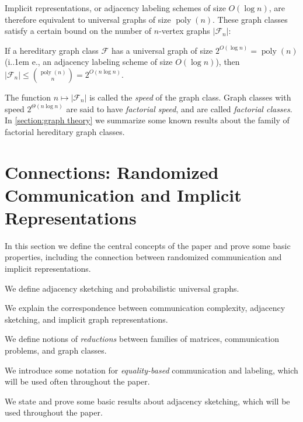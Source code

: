 \documentclass{article}
\makeatletter
\DeclareMathOperator{\poly}{poly}
\newcommand{\cF}{\ensuremath{\mathcal{F}}}
\newcommand*\ie{i.\kern.1em e.\@\xspace} %
\makeatother
\begin{document}
Implicit representations, or adjacency labeling schemes of size $O(\log n)$, are therefore
equivalent to universal graphs of size $\poly(n)$. These graph classes satisfy a certain bound on
the number of $n$-vertex graphs $|\cF_n|$:

\begin{proposition}
\label{prop:knr}
If a hereditary graph class $\cF$ has a universal graph of size $2^{O(\log n)}=\poly(n)$
(\ie, an adjacency labeling scheme of size $O(\log n)$), then $|\cF_n|
\leq \binom{\poly(n)}{n} = 2^{O(n \log n)}$.
\end{proposition}

The function $n \mapsto |\cF_n|$ is called the \emph{speed} of the graph class. Graph classes with
speed $2^{\Theta(n \log n)}$ are said to have \emph{factorial speed}, and are called
\emph{factorial classes}.  In \cref{section:graph theory} we summarize some known results about the family of factorial hereditary graph classes.

\section{Connections: Randomized Communication and Implicit Representations}
\label{section:definitions}

In this section we define the central concepts of the paper and prove some basic properties,
including the connection between randomized communication and implicit representations.
\begin{description}[itemsep=0pt]
\item[\cref{section:adjacency-labeling}:] We define adjacency sketching and probabilistic
universal graphs.
\item[\cref{section:correspondence}:] We explain the correspondence between communication
complexity, adjacency sketching, and implicit graph representations.
\item[\cref{section:reductions}:] We define notions of \emph{reductions} between families of
matrices, communication problems, and graph classes.
\item[\cref{section:equality-based-labeling}:] We introduce some notation for
\emph{equality-based} communication and labeling, which will be used often throughout the paper.
\item[\cref{sec:bounded-arboricity}:] We state and prove some basic results about adjacency
sketching, which will be used throughout the paper.
\end{description}
\end{document}
